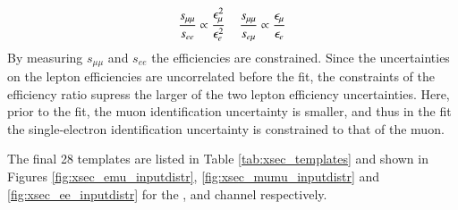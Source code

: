 \begin{equation}
\frac{s_{\mu\mu}}{s_{ee}} \propto \frac{\epsilon_{\mu}^2}{\epsilon_{e}^2} \hspace{0.4cm} \frac{s_{\mu\mu}}{s_{e\mu}} \propto \frac{\epsilon_{\mu}}{\epsilon_{e}}
\label{eq:xsec_lepeffs}
\end{equation}
By measuring $s_{\mu\mu}$ and $s_{ee}$ the efficiencies are constrained.
Since the uncertainties on the lepton efficiencies are uncorrelated before the fit, the constraints of the efficiency ratio supress the larger of the two lepton efficiency uncertainties.
Here, prior to the fit, the muon identification uncertainty is smaller, and thus in the fit the single-electron identification uncertainty is constrained to that of the muon.

The final 28 templates are listed in Table \ref{tab:xsec_templates} and shown in Figures 
 \ref{fig:xsec_emu_inputdistr}, \ref{fig:xsec_mumu_inputdistr} and \ref{fig:xsec_ee_inputdistr} for the \emu, \mumu and \ee channel respectively.




